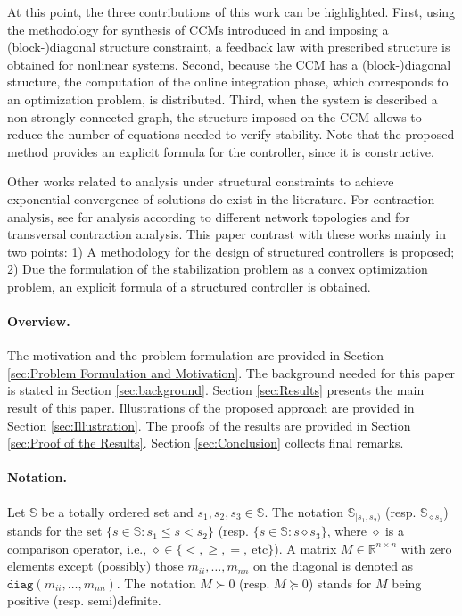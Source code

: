 \documentclass[10pt,twocolumn,twoside]{IEEEtran}
\theoremstyle{plain}
\theoremstyle{definition}
\theoremstyle{remark}
\begin{document}
At this point, the three contributions of this work can be highlighted. First, using the methodology for synthesis of CCMs introduced in \cite{Manchester2014a} and imposing a (block-)diagonal structure constraint, a feedback law with prescribed structure is obtained for nonlinear systems. Second, because the CCM has a (block-)diagonal structure, the computation of the online integration phase, which corresponds to an optimization problem, is distributed. Third, when the system is described a non-strongly connected graph, the structure imposed on the CCM allows to reduce the number of equations needed to  verify stability. Note that the proposed method provides an explicit formula for the controller, since it is constructive.

Other works related to analysis under structural constraints to achieve exponential convergence of solutions do exist in the literature. For contraction analysis, see \cite{Aminzare2014a} for analysis according to different network topologies and \cite{Andrieu2016} for transversal contraction analysis. This paper contrast with these works mainly in two points: 1) A  methodology for the design of structured controllers is proposed; 2) Due the formulation of the stabilization problem as a convex optimization problem, an explicit formula of a structured controller is obtained.

\paragraph{Overview.} The motivation and the problem formulation are provided in Section \ref{sec:Problem Formulation and Motivation}. The background needed for this paper is stated in Section \ref{sec:background}. Section \ref{sec:Results} presents the main result of this paper. Illustrations of the proposed approach are provided in Section \ref{sec:Illustration}. The proofs of the results are provided in Section \ref{sec:Proof of the Results}. Section \ref{sec:Conclusion} collects final remarks.

\paragraph{Notation.} Let $\mathbb{S}$ be a totally ordered set and $s_1,s_2,s_3\in\mathbb{S}$. The notation $\mathbb{S}_{[s_1,s_2)}$ (resp. $\mathbb{S}_{\diamond s_3}$) stands for the set $\{s\in\mathbb{S}:s_1\leq s< s_2\}$ (resp. $\{s\in\mathbb{S}:s\diamond s_3\}$, where $\diamond$ is a comparison operator, i.e., $\diamond\in\{<,\geq,=,\ \text{etc}\}$). A matrix $M\in\mathbb{R}^{n\times n}$ with zero elements except (possibly) those  $m_{ii},\ldots,m_{nn}$ on the diagonal is denoted as $\mathbin{\mathtt{diag}}(m_{ii},\ldots,m_{nn})$. The notation $M\succ 0$ (resp. $M\succeq 0$) stands for $M$ being positive (resp. semi)definite.
\end{document}
